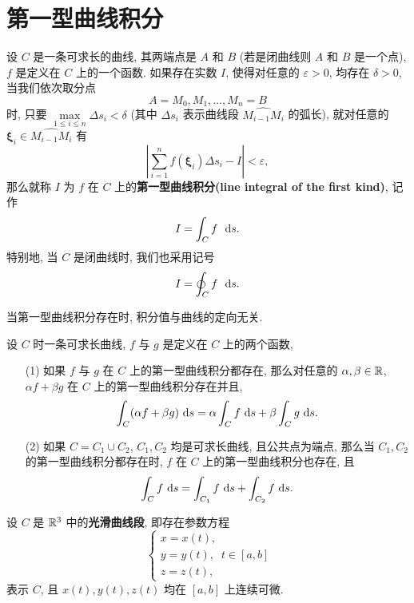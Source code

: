 \section{第一型曲线积分}

\begin{definition}\label{第一型曲线积分}
	设 $C$ 是一条可求长的曲线, 其两端点是 $A$ 和 $B$ (若是闭曲线则 $A$ 和 $B$ 是一个点), $f$ 是定义在 $C$ 上的一个函数. 如果存在实数 $I$, 使得对任意的 $\varepsilon>0$, 均存在 $\delta>0$, 当我们依次取分点 $$A=M_0,M_1,\ldots,M_n=B$$ 时, 只要 $\max\limits_{1\leqslant i\leqslant n}\Delta s_i<\delta$ (其中 $\Delta s_i$ 表示曲线段 $\widehat{M_{i-1}M_i}$ 的弧长), 就对任意的 $\bm\xi_i\in\widehat{M_{i-1}M_i}$ 有 $$\left|\sum\limits_{i=1}^n f(\bm\xi_i)\Delta s_i-I\right|<\varepsilon,$$ 那么就称 $I$ 为 $f$ 在 $C$ 上的\textbf{第一型曲线积分(line integral of the first kind)}, 记作 $$I=\int_C f\ \ \text {d} s.$$ 特别地, 当 $C$ 是闭曲线时, 我们也采用记号 $$I=\oint_C f\ \ \text {d} s.$$
\end{definition}

\begin{remark}
	 当第一型曲线积分存在时, 积分值与曲线的定向无关.
\end{remark}

\begin{proposition}
	设 $C$ 时一条可求长曲线, $f$ 与 $g$ 是定义在 $C$ 上的两个函数,
	\begin{itemize}[leftmargin=1.5cm]
		\item[(1)] 如果 $f$ 与 $g$ 在 $C$ 上的第一型曲线积分都存在, 那么对任意的 $\alpha,\beta\in\mathbb R$, $\alpha f+\beta g$ 在 $C$ 上的第一型曲线积分存在并且, $$\int_C (\alpha f + \beta g)\ \text {d} s=\alpha\int_C f\ \text {d} s + \beta\int_C g\ \text {d} s.$$
		\item[(2)] 如果 $C=C_1\cup C_2$, $C_1,C_2$ 均是可求长曲线, 且公共点为端点, 那么当 $C_1,C_2$ 的第一型曲线积分都存在时, $f$ 在 $C$ 上的第一型曲线积分也存在, 且 $$\int_C f\ \text {d} s=\int_{C_1} f\ \text {d} s+\int_{C_2} f\ \text {d} s.$$
	\end{itemize}
\end{proposition}

\begin{definition}\label{R3光滑曲线段}
	设 $C$ 是 $\mathbb R^3$ 中的\textbf{光滑曲线段}, 即存在参数方程 $$\left\{\begin{array}{c}
		x=x(t),\\
		y=y(t),\\
		z=z(t),
	\end{array}\right. t\in [a,b]$$ 表示 $C$, 且 $x(t),y(t),z(t)$ 均在 $[a,b]$ 上连续可微.
\end{definition}

